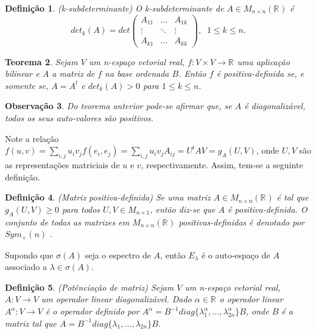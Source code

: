 \documentclass[12pt]{book}
\newtheorem{teorema}{Teorema}[section]
\newtheorem{definicao}[teorema]{Definição}
\newtheorem{observacao}[teorema]{Observação}
\newcommand{\autoespaco}[1]{E_{#1}}
\newcommand{\espectrooperador}[1]{\sigma(#1)}
\newcommand{\matrizquadreal}[1]{M_{#1 \times #1}(\real{})}
\newcommand{\matrizsimetricapositiva}[1]{Sym_{+}(#1)}
\newcommand{\real}[1]{\mathbb{R}^{#1}}
\newcommand{\reta}{\real{}}
\begin{document}
	\begin{definicao}
		(k-subdeterminante) O k-subdeterminante de $A \in \matrizquadreal{n}$ é 
		$$
		det_{k}(A) =
		det \left(
		\begin{array}{ccc}
		A_{11} & \dots & A_{1k}
		\\
		\vdots & \ddots & \vdots
		\\
		A_{k1} & \dots & A_{kk}
		\end{array}
		\right),\;\; 1\leq k \leq n.
		$$
	\end{definicao}
	
	\begin{teorema}\label{teorema_matriz_positiva_definida}
		Sejam $V$ um n-espaço vetorial real, $f: V\times V\to \reta$ uma aplicação bilinear e $A$ a matriz de $f$ na base ordenada $B$. Então $f$ é positiva-definida se, e somente se, $A=A^{t}$ e $det_{k}(A)>0$ para $1\leq k\leq n$.
	\end{teorema}
	
	\begin{observacao}\label{observacao_matriz_positiva_definida}
		Do teorema anterior pode-se afirmar que, se $A$ é diagonalizável, todos os seus auto-valores são positivos.
	\end{observacao}
	
	Note a relação $f(u, v) = \sum_{i, j}u_{i}v_{j}f(e_{i}, e_{j}) = \sum_{i, j}u_{i}v_{j}A_{ij} = U^{t}AV = g_{A}(U, V)$, onde $U, V$ são as representações matriciais de $u$ e $v$, respectivamente. Assim, tem-se a seguinte definição.
	
	\begin{definicao}\label{definicao_matriz_positiva_definida}
		(Matriz positiva-definida) Se uma matriz $A \in \matrizquadreal{n}$ é tal que $g_{A}(U, V)\geq 0$ para todos $U,V \in M_{n\times 1}$, então diz-se que $A$ é positiva-definida. O conjunto de todas as matrizes em $\matrizquadreal{n}$ positivas-definidas é denotado por $\matrizsimetricapositiva{n}$ .
	\end{definicao}
	
	Supondo que $\espectrooperador{A}$ seja o espectro de $A$, então $\autoespaco{\lambda}$ é o auto-espaço de $A$ associado a $\lambda \in \espectrooperador{A}$.
	
	\begin{definicao}\label{definicao_potenciacao_matriz}
		(Potênciação de matriz) Sejam $V$ um n-espaço vetorial real, $A:V \to V$ um operador linear diagonalizável. Dado $\alpha \in \real{}$ o operador linear $A^{\alpha}:V \to V$ é o operador definido por $A^{\alpha} = B^{-1}diag\{ \lambda_{1}^{\alpha} , \dots, \lambda_{2n}^{\alpha} \}B$, onde $B$ é a matriz tal que $A= B^{-1}diag\{ \lambda_{1}, \dots, \lambda_{2n}\}B$.
	\end{definicao}
	
\end{document}
